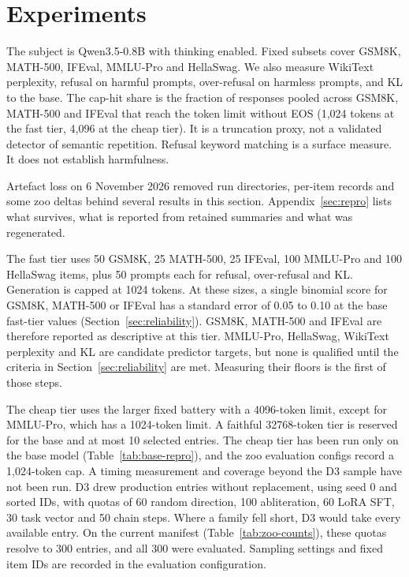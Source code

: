 \section{Experiments}
The subject is Qwen3.5-0.8B with thinking enabled. Fixed subsets cover GSM8K, MATH-500, IFEval, MMLU-Pro and HellaSwag. We also measure WikiText perplexity, refusal on harmful prompts, over-refusal on harmless prompts, and KL to the base. The cap-hit share is the fraction of responses pooled across GSM8K, MATH-500 and IFEval that reach the token limit without EOS (1,024 tokens at the fast tier, 4,096 at the cheap tier). It is a truncation proxy, not a validated detector of semantic repetition. Refusal keyword matching is a surface measure. It does not establish harmfulness.

Artefact loss on 6 November 2026 removed run directories, per-item records and some zoo deltas behind several results in this section. Appendix~\ref{sec:repro} lists what survives, what is reported from retained summaries and what was regenerated.

The fast tier uses 50 GSM8K, 25 MATH-500, 25 IFEval, 100 MMLU-Pro and 100 HellaSwag items, plus 50 prompts each for refusal, over-refusal and KL. Generation is capped at 1024 tokens. At these sizes, a single binomial score for GSM8K, MATH-500 or IFEval has a standard error of 0.05 to 0.10 at the base fast-tier values (Section~\ref{sec:reliability}). GSM8K, MATH-500 and IFEval are therefore reported as descriptive at this tier. MMLU-Pro, HellaSwag, WikiText perplexity and KL are candidate predictor targets, but none is qualified until the criteria in Section~\ref{sec:reliability} are met. Measuring their floors is the first of those steps.

The cheap tier uses the larger fixed battery with a 4096-token limit, except for MMLU-Pro, which has a 1024-token limit. A faithful 32768-token tier is reserved for the base and at most 10 selected entries. The cheap tier has been run only on the base model (Table~\ref{tab:base-repro}), and the zoo evaluation configs record a 1,024-token cap. A timing measurement and coverage beyond the D3 sample have not been run. D3 drew production entries without replacement, using seed 0 and sorted IDs, with quotas of 60 random direction, 100 abliteration, 60 LoRA SFT, 30 task vector and 50 chain steps. Where a family fell short, D3 would take every available entry. On the current manifest (Table~\ref{tab:zoo-counts}), these quotas resolve to 300 entries, and all 300 were evaluated. Sampling settings and fixed item IDs are recorded in the evaluation configuration.

